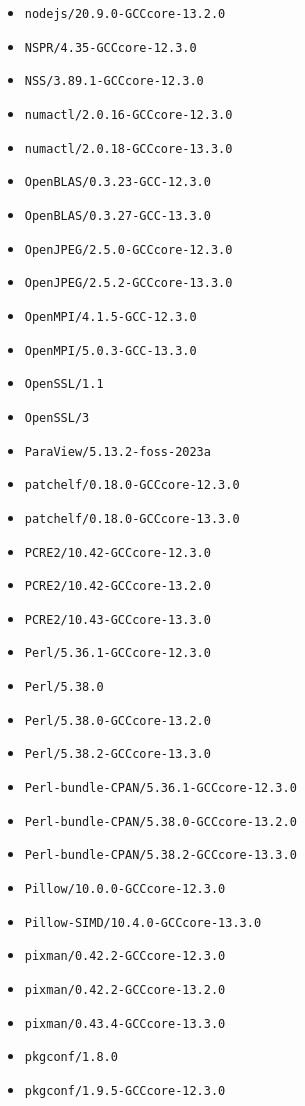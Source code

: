 \begin{multicols}{3}
\begin{itemize}
\item \verb|nodejs/20.9.0-GCCcore-13.2.0|
\item \verb|NSPR/4.35-GCCcore-12.3.0|
\item \verb|NSS/3.89.1-GCCcore-12.3.0|
\item \verb|numactl/2.0.16-GCCcore-12.3.0|
\item \verb|numactl/2.0.18-GCCcore-13.3.0|
\item \verb|OpenBLAS/0.3.23-GCC-12.3.0|
\item \verb|OpenBLAS/0.3.27-GCC-13.3.0|
\item \verb|OpenJPEG/2.5.0-GCCcore-12.3.0|
\item \verb|OpenJPEG/2.5.2-GCCcore-13.3.0|
\item \verb|OpenMPI/4.1.5-GCC-12.3.0|
\item \verb|OpenMPI/5.0.3-GCC-13.3.0|
\item \verb|OpenSSL/1.1|
\item \verb|OpenSSL/3|
\item \verb|ParaView/5.13.2-foss-2023a|
\item \verb|patchelf/0.18.0-GCCcore-12.3.0|
\item \verb|patchelf/0.18.0-GCCcore-13.3.0|
\item \verb|PCRE2/10.42-GCCcore-12.3.0|
\item \verb|PCRE2/10.42-GCCcore-13.2.0|
\item \verb|PCRE2/10.43-GCCcore-13.3.0|
\item \verb|Perl/5.36.1-GCCcore-12.3.0|
\item \verb|Perl/5.38.0|
\item \verb|Perl/5.38.0-GCCcore-13.2.0|
\item \verb|Perl/5.38.2-GCCcore-13.3.0|
\item \verb|Perl-bundle-CPAN/5.36.1-GCCcore-12.3.0|
\item \verb|Perl-bundle-CPAN/5.38.0-GCCcore-13.2.0|
\item \verb|Perl-bundle-CPAN/5.38.2-GCCcore-13.3.0|
\item \verb|Pillow/10.0.0-GCCcore-12.3.0|
\item \verb|Pillow-SIMD/10.4.0-GCCcore-13.3.0|
\item \verb|pixman/0.42.2-GCCcore-12.3.0|
\item \verb|pixman/0.42.2-GCCcore-13.2.0|
\item \verb|pixman/0.43.4-GCCcore-13.3.0|
\item \verb|pkgconf/1.8.0|
\item \verb|pkgconf/1.9.5-GCCcore-12.3.0|

\end{itemize}
\end{multicols}
